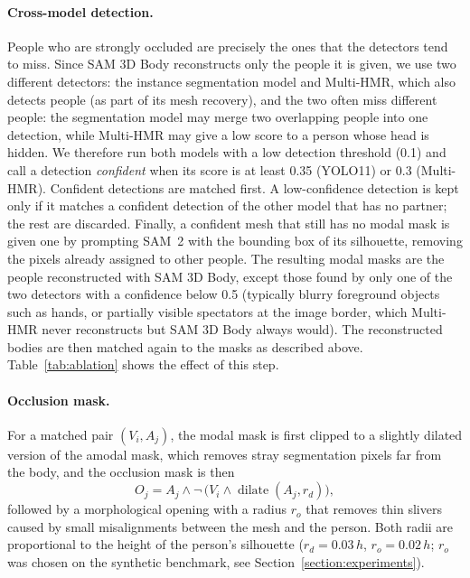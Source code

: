 \documentclass[11pt,a4paper]{article}
\begin{document}
\paragraph{Cross-model detection.}
People who are strongly occluded are precisely the ones that the detectors tend to miss. Since SAM 3D Body reconstructs only the people it is given, we use two different detectors: the instance segmentation model and Multi-HMR, which also detects people (as part of its mesh recovery), and the two often miss different people: the segmentation model may merge two overlapping people into one detection, while Multi-HMR may give a low score to a person whose head is hidden. We therefore run both models with a low detection threshold (0.1) and call a detection \emph{confident} when its score is at least 0.35 (YOLO11) or 0.3 (Multi-HMR). Confident detections are matched first. A low-confidence detection is kept only if it matches a confident detection of the other model that has no partner; the rest are discarded. Finally, a confident mesh that still has no modal mask is given one by prompting SAM~2 with the bounding box of its silhouette, removing the pixels already assigned to other people. The resulting modal masks are the people reconstructed with SAM 3D Body, except those found by only one of the two detectors with a confidence below 0.5 (typically blurry foreground objects such as hands, or partially visible spectators at the image border, which Multi-HMR never reconstructs but SAM 3D Body always would). The reconstructed bodies are then matched again to the masks as described above. Table~\ref{tab:ablation} shows the effect of this step.

\paragraph{Occlusion mask.}
For a matched pair $(V_i, A_j)$, the modal mask is first clipped to a slightly dilated version of the amodal mask, which removes stray segmentation pixels far from the body, and the occlusion mask is then
\begin{equation}
O_j = A_j \land \lnot\, \big(V_i \land \operatorname{dilate}(A_j, r_d)\big),
\end{equation}
followed by a morphological opening with a radius $r_o$ that removes thin slivers caused by small misalignments between the mesh and the person. Both radii are proportional to the height of the person's silhouette ($r_d = 0.03\,h$, $r_o = 0.02\,h$; $r_o$ was chosen on the synthetic benchmark, see Section~\ref{section:experiments}).
\end{document}
